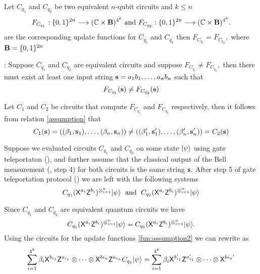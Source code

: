 \begin{lemma}
\label{lemma:nqubit}
Let $C_{q_1}$ and $C_{q_2}$ be two equivalent $n$-qubit circuits  and $k\leq n$
\begin{equation*}
 F_{C_{q_1}}:\{0,1\}^{2n}\longrightarrow  (\mathbb{C} \times {\bf B})^{4^k} \mbox{ and }
  F_{C_{q_2}}:\{0,1\}^{2n}\longrightarrow  (\mathbb{C} \times {\bf B})^{4^k}.
\end{equation*}
are the corresponding update functions for $C_{q_1}$ and $C_{q_2}$  then $F_{C_{q_1}}=F_{C_{q_2}},$ where ${\bf B}=\{0,1\}^{2n}$
\end{lemma}

: Suppose $C_{q_1}$ and $C_{q_2}$ are equivalent circuits and suppose $F_{C_{q_1}}\neq F_{C_{q_2}},$  then there must exist at least one input string ${\bf s}=a_1b_1,\ldots, a_nb_n$ such that
\begin{equation}
\label{assumption}
F_{C_{q_1}}({\bf s})\neq F_{C_{q_2}}({\bf s})
\end{equation}

Let $C_1$ and $C_2$ be circuits that compute $F_{C_{q_1}}$ and $F_{C_{q_2}}$ respectively, then it follows from relation \ref{assumption} that
\begin{equation}
\label{fun:assumption2}
C_1({\bf s)}=((\beta_1, {\bf s}_1),\ldots, (\beta_n, {\bf s}_n))\neq ((\beta_1^\prime, {\bf s}_1^\prime),\ldots, (\beta_n^\prime, {\bf s}_n^\prime))=C_2({\bf s})
\end{equation}

Suppose we evaluated circuits $C_{q_1}$ and $C_{q_2}$ on some state ${\lvert}\psi\rangle$ using gate teleportaton (), and further assume that the classical output of the Bell measurement (, step 4) for both circuits is the same string ${\bf s}.$ After step 5 of gate teleportation protocol () we are left with the following systems
 \begin{equation*}
C_{q_1} ({\sf X}^{a_{i}}{\sf Z}^{b_{i}})^{\otimes_{i=1}^{n}}{\lvert}\psi\rangle \;\mbox{ and }\;
C_{q_2} ({\sf X}^{a_{i}}{\sf Z}^{b_{i}})^{\otimes_{i=1}^{n}}{\lvert}\psi\rangle
\end{equation*}

Since $C_{q_1}$ and $C_{q_2}$ are equivalent quantum circuits we have
 \begin{equation}
 \label{nqubit:eq10}
C_{q_1} ({\sf X}^{a_{i}}{\sf Z}^{b_{i}})^{\otimes_{i=1}^{n}}{\lvert}\psi\rangle=C_{q_2} ({\sf X}^{a_{i}}{\sf Z}^{b_{i}})^{\otimes_{i=1}^{n}}{\lvert}\psi\rangle.
\end{equation}
Using the circuits for the update functions \ref{fun:assumption2} we can rewrite  as
\begin{equation}
 \label{nqubit:eq11}
\sum_{i=1}^{4^k} \beta_i {\sf X}^{b_{i_1}} {\sf Z}^{a_{i_1}}\otimes \cdots \otimes {\sf X}^{b{i_n}} {\sf Z}^{a_{i_n}}C_{q_1}{\lvert}\psi\rangle=\sum_{i=1}^{4^k} \beta_i {\sf X}^{b_{i_1}^\prime} {\sf Z}^{a_{i_1}^\prime}\otimes \cdots \otimes {\sf X}^{b{i_n}^\prime}
\end{equation}

